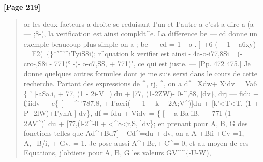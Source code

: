 \documentclass[11pt,a4paper]{book}
\begin{document}
\textbf{[Page 219]}\\[0.2cm]
\begin{quote}
or les deux facteurs a droite se reduisant I'un et I'autre a
c'est-a-dire a (a- --- ;8-), la verification est ainsi compldt\textasciicircum{}e.
La difference be --- cd donne un exemple beaucoup plus simple on a
;
be --- cd = 1 +o . ] +6 (--- 1 +a6xy)
=
F2(~\{\}*'\textasciicircum{}'\textasciicircum{}iTyiS8i);
r\textasciicircum{}quation k verifier est ainsi
-
4a-o-i77,8Si
=(-
cro-,S8i
-
771)°
-(-
o-c7,SS,
+
771)",
ce qui est juste.
---
[Pp. 472 475.] Je donne quelques autres formules dont je me suis servi dans le
cours de cette recherche. Partant des expressions de \textasciicircum{}, rj, \textasciicircum{}, on a
d\textasciicircum{}=Xdw+ Xidv = Va6 \{ ' [-aSa.i, + 77, (1 - 2i-V=)]du
+ [77, (1-2ZW)- 0-\textasciicircum{},88, ]dv\},
drj --- fidu + fjiidv --- c\{ [ --- \textasciicircum{}-'787,8, + I'acri( --- 1 ---k--- 2A;V\textasciicircum{})]du
+ [k'<T<T, (1 + P- 2lW)+I'yhA ] dv\},
df = fdu + Vidv = \{ [--- a-Ba-iB, --- 771 (1 --- 2AV\textasciicircum{})] du
+ [77,(l-2\textasciicircum{}-0 + <\textasciicircum{}8<r,S, ]dv\};
en prenant pour A, B, G des fonctions telles que
Ad\textasciicircum{}+Bd7] +Cd\textasciicircum{}=du +
dv,
on a
A +Bfi +Cv =1,
A,+B/i, + Gv, = 1.
Je pose aussi
A\textasciicircum{}+Br,+ C\textasciicircum{}=
0,
et au moyen de ces Equations, j'obtiens pour A, B, G les valeurs
GV\textasciicircum{}\textasciicircum{}\{-U-W),
\end{quote}
\end{document}
